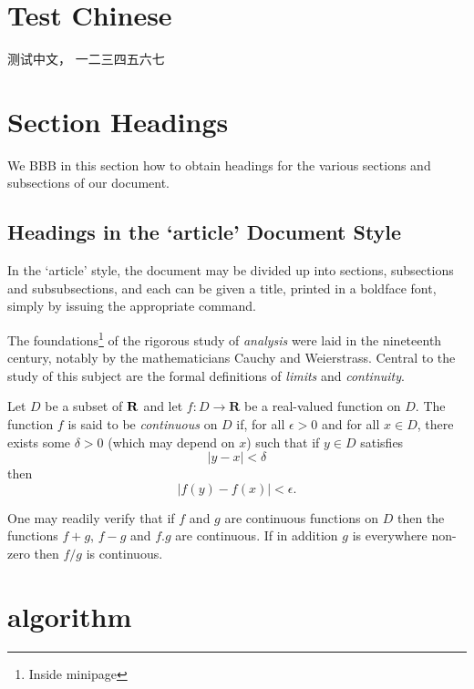 \section{Test Chinese}
\begin{CJK}{UTF8}{gbsn}
测试中文， 一二三四五六七
\end{CJK}
\section{Section Headings}
We \citep{Ancey1996} BBB \citep{RR73} in this section how to obtain headings
for the various sections and subsections of our
document.
\subsection{Headings in the ‘article’ Document Style}
In the ‘article’ style, the document may be divided up
into sections, subsections and subsubsections, and each
can be given a title, printed in a boldface font,
simply by issuing the appropriate command.

The foundations\footnote{Inside minipage} of the rigorous study of \textit{analysis}
were laid in the nineteenth century, notably by the
mathematicians Cauchy and Weierstrass. Central to the
study of this subject are the formal definitions of
\textit{limits} and \textit{continuity}.

Let $D$ be a subset of $\bf R$ and let
$f \colon D \to \textbf{R}$ be a real-valued function on
$D$. The function $f$ is said to be \textit{continuous} on
$D$ if, for all $\epsilon > 0$ and for all $x \in D$,
there exists some $\delta > 0$ (which may depend on $x$)
such that if $y \in D$ satisfies
\[ |y - x| < \delta \]
then
\[ |f(y) - f(x)| < \epsilon. \]

One may readily verify that if $f$ and $g$ are continuous
functions on $D$ then the functions $f+g$, $f-g$ and
$f.g$ are continuous. If in addition $g$ is everywhere
non-zero then $f/g$ is continuous.

\section{algorithm}

